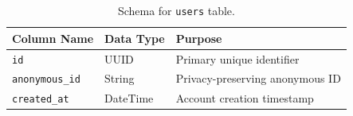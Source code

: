 \begin{table}[H]
    \centering
    \begin{tabular}{llp{6.5cm}}
        \toprule
        \textbf{Column Name}   & \textbf{Data Type} & \textbf{Purpose}                \\
        \midrule
        \texttt{id}            & UUID               & Primary unique identifier       \\
        \texttt{anonymous\_id} & String             & Privacy-preserving anonymous ID \\
        \texttt{created\_at}   & DateTime           & Account creation timestamp      \\
        \bottomrule
    \end{tabular}
    \caption{Schema for \texttt{users} table.}
    \label{tab:users_schema}
\end{table}
